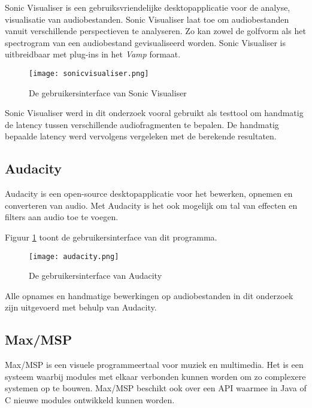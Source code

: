 Sonic Visualiser is een gebruiksvriendelijke desktopapplicatie voor de analyse, visualisatie van audiobestanden. Sonic Visualiser laat toe om audiobestanden vanuit verschillende perspectieven te analyseren. Zo kan zowel de golfvorm als het spectrogram van een audiobestand gevisualiseerd worden. Sonic Visualiser is uitbreidbaar met plug-ins in het \textit{Vamp} formaat. \cite{cannam2010sonic}

\begin{figure}[!h]
	\captionsetup{width=0.8\textwidth}
	\caption[Gebruikersinterface van Sonic Visualiser]{De gebruikersinterface van Sonic Visualiser}
	\advance\parskip0.3cm
	\centering
	\texttt{[image: sonicvisualiser.png]}
\end{figure}

Sonic Visualiser werd in dit onderzoek vooral gebruikt als testtool om handmatig de latency tussen verschillende audiofragmenten te bepalen. De handmatig bepaalde latency werd vervolgens vergeleken met de berekende resultaten.

\subsection{Audacity}

Audacity is een open-source desktopapplicatie voor het bewerken, opnemen en converteren van audio. Met Audacity is het ook mogelijk om tal van effecten en filters aan audio toe te voegen.\cite{audacity2016} 

Figuur \ref{screenshot-audacity} toont de gebruikersinterface van dit programma.

\begin{figure}[!h]
	\captionsetup{width=0.8\textwidth}
	\caption[Gebruikersinterface van Audacity]{De gebruikersinterface van Audacity}
	\centering
	\advance\parskip0.3cm
	\texttt{[image: audacity.png]}
	\label{screenshot-audacity}
\end{figure}

Alle opnames en handmatige bewerkingen op audiobestanden in dit onderzoek zijn uitgevoerd met behulp van Audacity. 

\subsection{Max/MSP}

Max/MSP is een visuele programmeertaal voor muziek en multimedia. Het is een systeem waarbij modules met elkaar verbonden kunnen worden om zo complexere systemen op te bouwen. Max/MSP beschikt ook over een API waarmee in Java of C nieuwe modules ontwikkeld kunnen worden. \cite{cycling2016}

